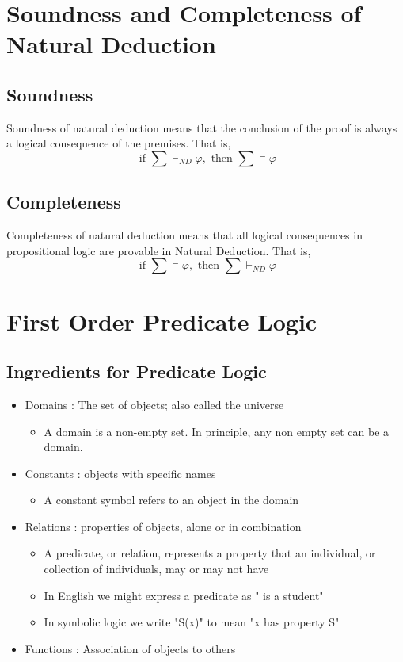 \documentclass{article}
\begin{document}
\section{Soundness and Completeness of Natural Deduction}
\subsection{Soundness}
Soundness of natural deduction means that the conclusion of the proof is always a logical consequence of the premises. That is, 
$$ \text{ if } \sum \vdash_{ND} \varphi, \text{ then } \sum \models \varphi$$
\subsection{Completeness}
Completeness of natural deduction means that all logical consequences in propositional logic are provable in Natural Deduction. That is, 
$$ \text{ if } \sum \models \varphi, \text{ then } \sum \vdash_{ND} \varphi $$


\section{First Order Predicate Logic}

\subsection{Ingredients for Predicate Logic}
\begin{itemize}
\item Domains : The set of objects; also called the universe 
\begin{itemize}
\item A domain is a non-empty set. In principle, any non empty set can be a domain.
\end{itemize}
\item Constants : objects with specific names
\begin{itemize}
\item A constant symbol refers to an object in the domain
\end{itemize}
\item Relations : properties of objects, alone or in combination
\begin{itemize}
\item A predicate, or relation, represents a property that an individual, or collection of individuals, may or may not have
\item In English we might express a predicate as "\underline{\hspace{2cm}} is a student"
\item In symbolic logic we write "S(x)" to mean "x has property S"
\end{itemize}
\item Functions : Association of objects to others 
\end{itemize}
\end{document}
